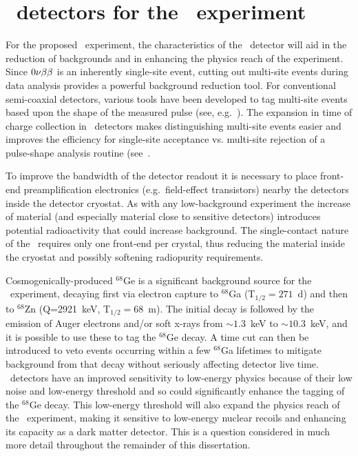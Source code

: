 	\section{\ppc~detectors for the \MJ~experiment}

For the proposed \MJ~experiment, the characteristics of the \ppc~detector
will aid in the reduction of backgrounds and in enhancing the physics reach of
the experiment.  Since $0 \nu \beta \beta$ is an inherently single-site event, cutting out
multi-site events during data analysis provides a powerful background reduction
tool.  For conventional semi-coaxial detectors, various tools have been developed
to tag multi-site events based upon the shape of the measured pulse (see,
e.g.~\cite{Aal00}).  The expansion in time
of charge collection in \ppc~detectors makes distinguishing multi-site events easier and improves the efficiency for single-site acceptance vs. multi-site rejection of a pulse-shape analysis routine (see~\cite{Budjas:2009zu,Ren10}.

To improve the bandwidth of the detector readout it is necessary to
place front-end preamplification electronics (e.g.~field-effect transistors) nearby the detectors
inside the detector cryostat.  As with any low-background 
experiment the increase of material (and especially material close to
sensitive detectors) introduces potential radioactivity that could
increase background.  The single-contact nature of the \ppc~requires only one
front-end per crystal, thus reducing the material inside the cryostat and possibly
softening radiopurity requirements.

Cosmogenically-produced $^{68}$Ge is a significant background
source for the \MJ~experiment, decaying first via electron capture to $^{68}$Ga
(T$_{1/2}=271$~d) and then to $^{68}$Zn (Q=2921~keV, T$_{1/2}=68$~m).  The
initial decay is followed by the emission of Auger electrons and/or soft x-rays
from $\sim1.3$~keV to $\sim10.3$~keV, and it is possible to use these to tag
the $^{68}$Ge decay.  A time cut can then be introduced to veto events
occurring within a few $^{68}$Ga lifetimes to mitigate background from that
decay without seriously affecting detector live time.   \ppc~detectors have an
improved sensitivity to low-energy physics because of their low noise and 
low-energy threshold and so could significantly enhance the tagging of the
$^{68}$Ge decay.  This low-energy threshold will also
expand the physics reach of the \MJ~experiment, making it sensitive to
low-energy nuclear recoils and enhancing its capacity as a dark matter
detector.  This is a question considered in much more detail 
throughout the remainder of this dissertation.


